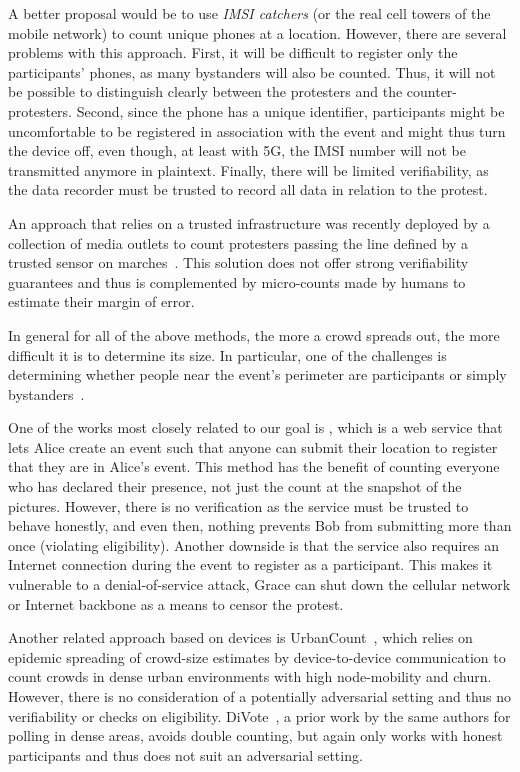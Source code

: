 A better proposal would be to use \emph{IMSI catchers} (or the real cell towers of the mobile network) to count unique phones at a location.
However, there are several problems with this approach.
First, it will be difficult to register only the participants' phones, as many bystanders will also be counted.
Thus, it will not be possible to distinguish clearly between the protesters and the counter-protesters.
Second, since the phone has a unique identifier, participants might be uncomfortable to be registered in association with the event and might thus turn the device off, even though, at least with 5G, the IMSI number will not be transmitted anymore in plaintext. %
Finally, there will be limited verifiability, as the data recorder must be trusted to record all data in relation to the protest.

An approach that relies on a trusted infrastructure was recently deployed by a collection of media outlets to count protesters passing the line defined by a trusted sensor on marches~\cite{LeMondeProtestingSolution}. 
This solution does not offer strong verifiability guarantees and thus is complemented by micro-counts made by humans to estimate their margin of error.

In general for all of the above methods, the more a crowd spreads out, the more difficult it is to determine its size.
In particular, one of the challenges is determining whether people near the event's perimeter are participants or simply bystanders~\cite{HowToEstimateCrowdSize}.

One of the works most closely related to our goal is \citet{CrowdCount}, which is a web service that lets Alice create an event such that anyone can submit their location to register that they are in Alice's event.
This method has the benefit of counting everyone who has declared their presence, not just the count at the snapshot of the pictures.
However, there is no verification as the service must be trusted to behave honestly, and even then, nothing prevents Bob from submitting more than once (violating eligibility).
Another downside is that the service also requires an Internet connection during the event to register as a participant.
This makes it vulnerable to a denial-of-service attack, \eg
Grace can shut down the cellular network or Internet backbone as a means to censor the protest.

Another related approach based on devices is UrbanCount~\cite{UrbanCount}, which relies on epidemic spreading of crowd-size estimates by device-to-device communication to count crowds in dense urban environments with high node-mobility and churn.
However, there is no consideration of a potentially adversarial setting and thus no verifiability or checks on eligibility.  DiVote~\cite{DiVote}, a prior work by the same authors for polling in dense areas, avoids double counting, but again only works with honest participants and thus does not suit an adversarial setting.

%
